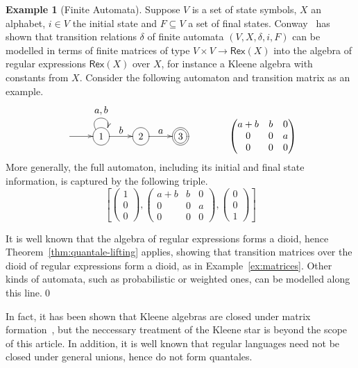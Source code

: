 \documentclass[12pt]{article}
\newcommand{\Al}{X}
\newcommand{\State}{V}
\theoremstyle{definition}
\newtheorem{example}{Example}
\begin{document}
\begin{example}[Finite Automata]\label{ex:finite-automata} 
  Suppose $\State$ is a set of state symbols, $\Al$ an alphabet, $i
  \in \State$ the initial state and $F \subseteq \State$ a set of
  final states. Conway~\cite{Conway71} has shown that transition
  relations $\delta$ of finite automata $(\State,\Al,\delta,i,F)$ can
  be modelled in terms of finite matrices of type $\State\times
  \State\to \mathsf{Rex}(\Al)$ into the algebra of regular expressions
  $\mathsf{Rex}(\Al)$ over $\Al$, for instance a Kleene algebra with
  constants from $\Al$. Consider the following automaton and
  transition matrix as an example.
\begin{equation*}
\def\labelstyle{\normalsize}
\xymatrix{
 {}\ar[r] &*++[o][F-]{1} \ar^{a,b}@(ul,ur)\ar^b[r] & *++[o][F-]{2} \ar^a[r] & *++[o][F=]{3}
}
\qquad\qquad
   \begin{pmatrix}
     a+b&b&0\\
     0&0&a\\
     0&0&0
   \end{pmatrix}
\end{equation*}
More generally, the full automaton, including its initial and final
state information, is captured by the following triple.
\begin{equation*}
\left[
\begin{pmatrix}
1\\
0\\
0
\end{pmatrix},
   \begin{pmatrix}
     a+b&b&0\\
     0&0&a\\
     0&0&0
   \end{pmatrix},
\begin{pmatrix}
0\\
0\\
1
\end{pmatrix}
\right]
\end{equation*}

It is well known that the algebra of regular expressions forms a
dioid, hence Theorem~\ref{thm:quantale-lifting} applies, showing that
transition matrices over the dioid of regular expressions form a
dioid, as in Example~\ref{ex:matrices}. Other kinds of automata, such
as probabilistic or weighted ones, can be modelled along this
line.\qed
\end{example}
In fact, it has been shown that Kleene algebras are closed under
matrix formation~\cite{Kozen91}, but the neccessary treatment of the
Kleene star is beyond the scope of this article.  In addition, it is
well known that regular languages need not be closed under general
unions, hence do not form quantales.
\end{document}
